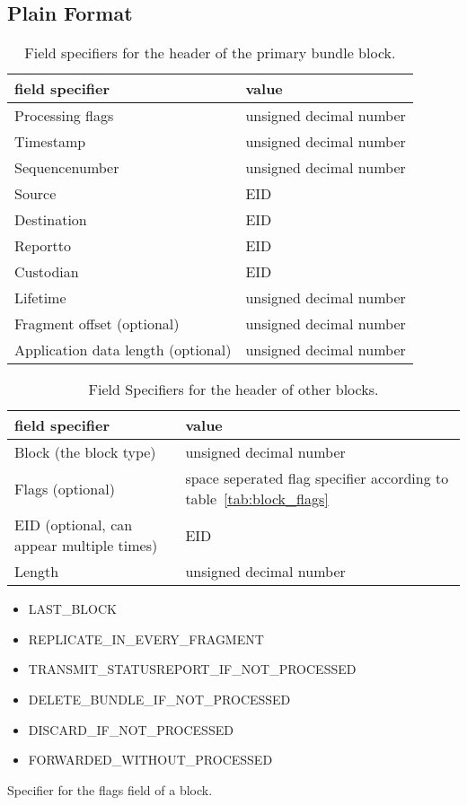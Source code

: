 \documentclass[12pt, a4paper]{scrartcl}
\begin{document}
\subsection{Plain Format}
\label{sec:plainformat}
\begin{table}
\centering
\begin{tabular}{l|l}
field specifier                    & value \\
\hline
Processing flags                   & unsigned decimal number\\
Timestamp                          & unsigned decimal number\\
Sequencenumber                     & unsigned decimal number\\
Source                             & EID\\
Destination                        & EID\\
Reportto                           & EID\\
Custodian                          & EID\\
Lifetime                           & unsigned decimal number\\
Fragment offset (optional)         & unsigned decimal number\\
Application data length (optional) & unsigned decimal number
\end{tabular}
\caption{Field specifiers for the header of the primary bundle block.}
\label{tab:pbb_fields}
\end{table}
\begin{table}
\centering
\begin{tabular}{l|l}
field specifier                           & value \\
\hline
Block (the block type)                    & unsigned decimal number\\
Flags (optional)                          & space seperated flag specifier according to table~\ref{tab:block_flags}\\
EID (optional, can appear multiple times) & EID\\
Length                                    & unsigned decimal number
\end{tabular}
\caption{Field Specifiers for the header of other blocks.}
\label{tab:block_fields}
\end{table}
\begin{table}
\centering
\begin{itemize}
\item LAST\_BLOCK
\item REPLICATE\_IN\_EVERY\_FRAGMENT
\item TRANSMIT\_STATUSREPORT\_IF\_NOT\_PROCESSED
\item DELETE\_BUNDLE\_IF\_NOT\_PROCESSED
\item DISCARD\_IF\_NOT\_PROCESSED
\item FORWARDED\_WITHOUT\_PROCESSED
\end{itemize}
\caption{Specifier for the flags field of a block.}
\label{tab:block_flags}
\end{table}
\end{document}
